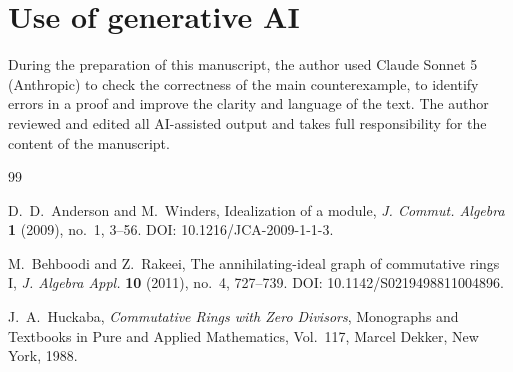 \documentclass[11pt]{article}
\theoremstyle{definition}
\theoremstyle{remark}
\begin{document}
	\section*{Use of generative AI}
	During the preparation of this manuscript, the author used Claude Sonnet 5
	(Anthropic) to check the correctness of the main counterexample, to identify
	errors in a proof and improve the clarity and language of the text. The author reviewed and edited all
	AI-assisted output and takes full responsibility for the content of the
	manuscript.
	
	
	\begin{thebibliography}{99}
		
		D.~D.~Anderson and M.~Winders,
		\newblock Idealization of a module,
		\newblock \emph{J. Commut. Algebra} \textbf{1} (2009), no.~1, 3--56.
		\newblock DOI: 10.1216/JCA-2009-1-1-3.
		
		M.~Behboodi and Z.~Rakeei,
		\newblock The annihilating-ideal graph of commutative rings I,
		\newblock \emph{J. Algebra Appl.} \textbf{10} (2011), no.~4, 727--739.
		\newblock DOI: 10.1142/S0219498811004896.
		
		J.~A.~Huckaba,
		\newblock \emph{Commutative Rings with Zero Divisors},
		\newblock Monographs and Textbooks in Pure and Applied Mathematics,
		Vol.~117, Marcel Dekker, New York, 1988.
		
	\end{thebibliography}
	
\end{document}
